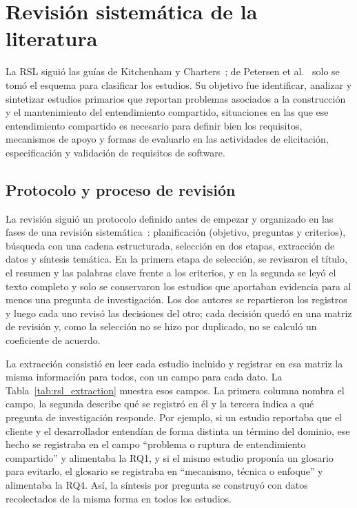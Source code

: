 \documentclass[12pt,letterpaper,oneside]{report}
\begin{document}
\section{Revisión sistemática de la literatura}
\label{sec:rsl}
La RSL siguió las guías de Kitchenham y Charters~\cite{kitchenham2007}; de
Petersen et al.~\cite{petersen2008systematic} solo se tomó el esquema para
clasificar los estudios. Su objetivo fue identificar, analizar y sintetizar estudios primarios que
reportan problemas asociados a la construcción y el mantenimiento del
entendimiento compartido, situaciones en las que ese entendimiento compartido es necesario
para definir bien los requisitos, mecanismos de apoyo y formas de evaluarlo en
las actividades de elicitación, especificación y validación de requisitos de
software.

\subsection{Protocolo y proceso de revisión}
La revisión siguió un protocolo definido antes de empezar y organizado en las
fases de una revisión sistemática~\cite{kitchenham2007}: planificación
(objetivo, preguntas y criterios), búsqueda con una cadena estructurada,
selección en dos etapas, extracción de datos y síntesis temática. En la primera
etapa de selección, se revisaron el título, el resumen y las palabras clave frente
a los criterios, y en la segunda se leyó el texto completo y solo se conservaron
los estudios que aportaban evidencia para al menos una pregunta de investigación.
Los dos autores se repartieron los registros y luego cada uno revisó las
decisiones del otro; cada decisión quedó en una matriz de revisión y, como la
selección no se hizo por duplicado, no se calculó un coeficiente de acuerdo.

La extracción consistió en leer cada estudio incluido y registrar en esa matriz
la misma información para todos, con un campo para cada dato.
La Tabla~\ref{tab:rsl_extraction} muestra esos campos. La primera columna nombra
el campo, la segunda describe qué se registró en él y la tercera indica a qué
pregunta de investigación responde. Por ejemplo, si un estudio reportaba que el
cliente y el desarrollador entendían de forma distinta un término del dominio,
ese hecho se registraba en el campo ``problema o ruptura de entendimiento compartido'' y
alimentaba la RQ1, y si el mismo estudio proponía un glosario para evitarlo, el
glosario se registraba en ``mecanismo, técnica o enfoque'' y alimentaba la RQ4.
Así, la síntesis por pregunta se construyó con datos recolectados de la misma
forma en todos los estudios.
\end{document}
